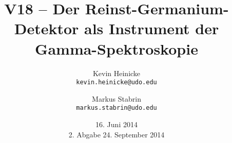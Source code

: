 \documentclass[%
    a4paper,%
    twoside,%
    BCOR12mm,%
    DIV13,%
    bibtotoc,%
    openany,%
    captions=tableheading,
]{scrartcl}
\title{%
        V18 -- Der Reinst-Germanium-Detektor als Instrument der Gamma-Spektroskopie
    }
\author{%
        Kevin Heinicke\\
        \texttt{kevin.heinicke@udo.edu}
        \and
        Markus Stabrin\\
        \texttt{markus.stabrin@udo.edu}
    }
\date{
        16. Juni 2014\\
        {\small 2. Abgabe} 24. September 2014
    }
\begin{document}
    \maketitle%
    \tableofcontents
    \newpage

    
    

    \FloatBarrier
    
    
\end{document}

